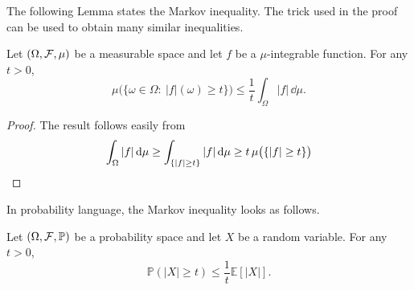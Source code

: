 The following Lemma states the Markov inequality. The trick used in the proof can be used to obtain many similar inequalities.

\begin{lemma}
	Let $(\Omega, \mathcal F, \mu)$ be a measurable space and let $f$ be a $\mu$-integrable function. For any $t>0$,
	\[
	\mu\bigl(\{ \omega \in \Omega : \ |f|(\omega) \geq t \}\bigr) \leq \frac{1}{t} \int_\Omega |f| \,\dd \mu.
	\]
\end{lemma}
\begin{proof} The result follows easily from
	\[
		\int_\Omega |f|\,\mathrm{d} \mu \ge \int_{\{|f|\ge t\}} |f|\,\mathrm{d} \mu \ge t\,\mu\bigl(\{|f|\ge t\}\bigr)  \qedhere
	\]
\end{proof}


In probability language, the Markov inequality looks as follows.

\begin{lemma}
	Let $(\Omega, \mathcal F, \mathbb{P})$ be a probability space and let $X$ be a random variable. For any $t>0$,
	\[
	\mathbb{P}(|X| \geq t) \leq \frac{1}{t} \mathbb{E}[|X|].
	\]
\end{lemma}

